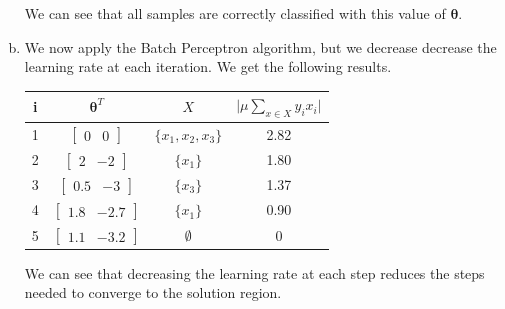 \documentclass[a4paper, 10pt, twoside]{article}
\begin{document}
\begin{enumerate}[a)]
          We can see that all samples are correctly classified with this value of $\bm{\theta}$.

    \item We now apply the Batch Perceptron algorithm, but we decrease decrease the learning rate at each iteration. We get the following results.

          \begin{table}[h]
              \centering
              \begin{tabular}{cccc}
                  i & $\bm{\theta}^T$              & $X$                   & $\vert \mu \sum_{x \in X} y_i x_i \vert$ \\
                  \toprule
                  1 & $\begin{bmatrix} 0 & 0 \end{bmatrix}$ & $\{ x_1, x_2, x_3 \}$ & 2.82                                     \\
                  2 & $\begin{bmatrix} 2 & -2 \end{bmatrix}$ & $\{ x_1 \}$           & 1.80                                     \\
                  3 & $\begin{bmatrix} 0.5 & -3 \end{bmatrix}$ & $\{ x_3 \}$           & 1.37                                     \\
                  4 & $\begin{bmatrix} 1.8 & -2.7 \end{bmatrix}$ & $\{ x_1 \}$           & 0.90                                     \\
                  5 & $\begin{bmatrix} 1.1 & -3.2 \end{bmatrix}$ & $ \emptyset $         & 0                                        \\
              \end{tabular}
          \end{table}

          We can see that decreasing the learning rate at each step reduces the steps needed to converge to the solution region.


\end{enumerate}
\end{document}
